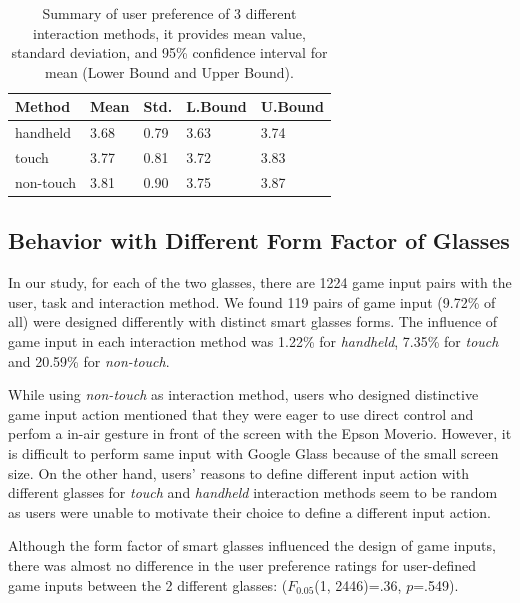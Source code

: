 \documentclass{sigchi}
\newcommand\tabhead[1]{\small\textbf{#1}}
\begin{document}
  \begin{table}
    \centering
    \begin{tabular}{|l|l|l|l|l|}
      \hline
      \tabhead{Method} &
      \multicolumn{1}{|p{0.13\columnwidth}|}{\centering\tabhead{Mean}} &
      \multicolumn{1}{|p{0.13\columnwidth}|}{\centering\tabhead{Std.}} &
      \multicolumn{1}{|p{0.13\columnwidth}|}{\centering\tabhead{L.Bound}} &
      \multicolumn{1}{|p{0.13\columnwidth}|}{\centering\tabhead{U.Bound}} \\
      \hline
      handheld & 3.68 & 0.79 & 3.63 & 3.74\\
      \hline
      touch & 3.77 & 0.81 & 3.72 & 3.83\\
      \hline
      non-touch & 3.81 & 0.90 & 3.75 & 3.87\\
      \hline

    

    \end{tabular}
    \caption{Summary of user preference of 3 different interaction methods, it provides mean value, standard deviation, and 95\% confidence interval for mean (Lower Bound and Upper Bound).}
    \label{tab:tablePreferenceInteractionMethod}
  \end{table}

  \subsection{Behavior with Different Form Factor of Glasses}
  In our study, for each of the two glasses, there are 1224 game input pairs with the user, task and interaction method. We found 119 pairs of game input (9.72\% of all) were designed differently with distinct smart glasses forms. The influence of game input in each interaction method was 1.22\% for \emph{handheld}, 7.35\% for \emph{touch} and 20.59\% for \emph{non-touch}.

  While using \emph{non-touch} as interaction method, users who designed distinctive game input action mentioned that they were eager to use direct control and perfom a in-air gesture in front of the screen with the Epson Moverio. However, it is difficult to perform same input with Google Glass because of the small screen size. On the other hand, users' reasons to define different input action with different glasses for \emph{touch} and \emph{handheld} interaction methods seem to be random as users were unable to motivate their choice to define a different input action.

  Although the form factor of smart glasses influenced the design of game inputs, there was almost no difference in the user preference ratings for user-defined game inputs between the 2 different glasses: ($F_{0.05}$(1, 2446)=.36, $p$=.549).
\end{document}
